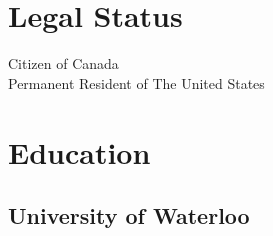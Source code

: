 \documentclass[letterpaper]{deedy-resume} %
\begin{document}
\begin{minipage}[t]{0.33\textwidth} %


  \section{Legal Status} 

  Citizen of Canada \\
  Permanent Resident of The United States

  \sectionspace %


  \section{Education} 

  \subsection{University of Waterloo}


  \sectionspace %









\end{minipage}
\end{document}

